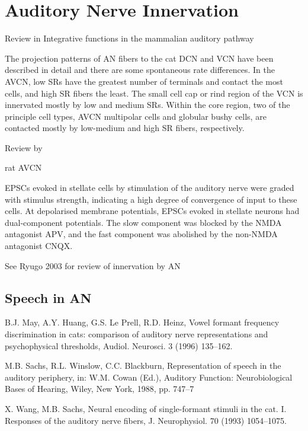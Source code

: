 \documentclass[10pt,a4paper]{article}
\begin{document}
\section{Auditory Nerve Innervation }

\citep{SmithSpirou:2002} 
Review in Integrative functions in the mammalian auditory pathway

The projection patterns of AN fibers to the cat DCN and VCN have been described in detail \citep{FeketeRouillerEtAl:1984,Liberman:1991,Liberman:1993,RoullierCronin-SchreiberEtAl:1986,Ryugo:1992,RyugoParks:2003}
and there are some spontaneous rate differences.  In the AVCN, low SRs have the
greatest number of terminals and contact the most cells, and high SR fibers the
least.  The small cell cap or rind region of the VCN is innervated mostly by low
and medium SRs.  Within the core region, two of the principle cell types, AVCN
multipolar cells and globular bushy cells, are contacted mostly by low-medium
and high SR fibers, respectively.

Review by \citep{Parks:2000}

\citep{PerneyKaczmarek:1997}

\citep{IsaacsonWalmsley:1995} rat AVCN

EPSCs evoked in stellate cells by stimulation of the auditory nerve were graded
with stimulus strength, indicating a high degree of convergence of input to
these cells. At depolarised membrane potentials, EPSCs evoked in stellate
neurons had dual-component potentials.  The slow component was blocked by the
NMDA antagonist APV, and the fast component was abolished by the non-NMDA
antagonist CNQX.

See Ryugo 2003 for review of innervation by AN

\subsection{Speech in AN}
B.J. May, A.Y. Huang, G.S. Le Prell, R.D. Heinz, Vowel formant
frequency discrimination in cats: comparison of auditory nerve
representations and psychophysical thresholds, Audiol. Neurosci. 3
(1996) 135--162.

M.B. Sachs, R.L. Winslow, C.C. Blackburn, Representation of
speech in the auditory periphery, in: W.M. Cowan (Ed.), Auditory
Function: Neurobiological Bases of Hearing, Wiley, New York,
1988, pp. 747--7

X. Wang, M.B. Sachs, Neural encoding of single-formant stimuli in
the cat. I. Responses of the auditory nerve fibers, J. Neurophysiol.
70 (1993) 1054--1075.
\end{document}
